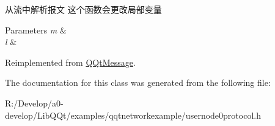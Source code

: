 从流中解析报文 这个函数会更改局部变量 


\begin{DoxyParams}{Parameters}
{\em m} & \\
\hline
{\em l} & \\
\hline
\end{DoxyParams}


Reimplemented from \mbox{\hyperlink{class_q_qt_message_a0bc25669bdd61490b1d8df6d77565f31}{Q\+Qt\+Message}}.



The documentation for this class was generated from the following file\+:\begin{DoxyCompactItemize}
\item 
R\+:/\+Develop/a0-\/develop/\+Lib\+Q\+Qt/examples/qqtnetworkexample/usernode0protocol.\+h\end{DoxyCompactItemize}
